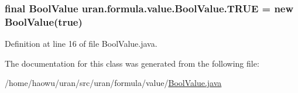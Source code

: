 \subsubsection[{T\+R\+U\+E}]{\setlength{\rightskip}{0pt plus 5cm}final {\bf Bool\+Value} uran.\+formula.\+value.\+Bool\+Value.\+T\+R\+U\+E = new {\bf Bool\+Value}(true)\hspace{0.3cm}{\ttfamily [static]}}\label{classuran_1_1formula_1_1value_1_1_bool_value_aa3ce9a9ee8cda8144593e4c4d54151b2}


Definition at line 16 of file Bool\+Value.\+java.



The documentation for this class was generated from the following file\+:\begin{DoxyCompactItemize}
\item 
/home/haowu/uran/src/uran/formula/value/\hyperlink{_bool_value_8java}{Bool\+Value.\+java}\end{DoxyCompactItemize}
